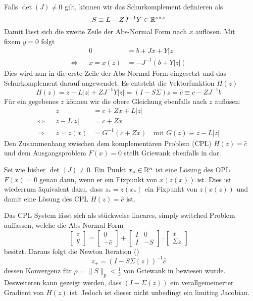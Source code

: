 Falls $\det(J) \neq 0$ gilt, können wir das Schurkomplement definieren als 
 \[
  S \equiv L -ZJ^{-1}Y \in \mathbb{R}^{s\times s}
 \]
Damit lässt sich die zweite Zeile der Abs-Normal Form nach $x$ auflösen. Mit fixem $y=0$ folgt
\[
 \begin{aligned}
		 && 0 &=  b+Jx + Y|z|   \\
 \iff && x = x(z) &=-J^{-1}(b+Y|z|)
 \end{aligned}
\]
Dies wird nun in die erste Zeile der Abs-Normal Form eingesetzt und das Schurkomplement darauf angewendet. Es entsteht die Vektorfunktion $H(z)$
\[
 H(z) = z - L|z| + ZJ^{-1}Y|z| = (I-S\Sigma)z = \hat c \equiv c-ZJ^{-1}b
 \]
Für ein gegebenes $z$ können wir die obere Gleichung ebenfalls nach $z$ auflösen:
\[
\begin{aligned}
		 && z &= c+Zx + L|z|\\
 \iff && z- L |z| &= c+Zx \\
 \Rightarrow && z = z(x) &= G^{-1}(c+Zx)\quad \text{mit }G(z)\equiv z-L|z|
\end{aligned} 
\]
Den Zusammenhang zwischen dem komplementären Problem (CPL) $H(z) = \hat c$ und dem Ausgangsproblem $F(x) = 0$ stellt Griewank ebenfalls in \cite[Lemma 6.5.]{plan} dar.

\begin{theorem}
 Sei wie bisher $\det(J)\neq 0$. Ein Punkt $x_*\in \mathbb{R}^n$ ist eine Lösung des OPL $F(x)=0$ genau dann, wenn er ein Fixpunkt von $x(z(x))$ ist. Dies ist wiederrum äquivalent dazu, dass $z_*=z(x_*)$ ein Fixpunkt von $z(x(z))$ und damit eine Lösung des CPL $H(z)=\hat c$ ist.
\end{theorem}

Das CPL System lässt sich als stückweise lineares, simply switched Problem auffassen, welche die Abs-Normal Form
\[
 \begin{bmatrix}
  z\\
  y
 \end{bmatrix}
=
 \begin{bmatrix}
  0\\
  -\hat c
 \end{bmatrix}
+
 \begin{bmatrix}
  I & 0\\
  I & -S
 \end{bmatrix}
\cdot
 \begin{bmatrix}
  x\\
  \Sigma z
 \end{bmatrix}
\]
besitzt. Daraus folgt die Newton Iteration (\cite[S.20]{plan})
\begin{equation}
\label{eq:unfoldedNewton}
 z_+ = (I-S\Sigma(z))^{-1}\hat c
\end{equation}
dessen Konvergenz für $\rho = \|S\|_p <\frac{1}{3}$ von Griewank in \cite[Prop. 7.3]{plan} bewiesen wurde. 
Desweiteren kann gezeigt werden, dass $(I-\Sigma(z))$ ein verallgemeinerter Gradient von $H(z)$ ist. Jedoch ist dieser nicht unbedingt ein limiting Jacobian.
 
